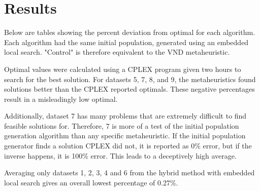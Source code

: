 \documentclass[11pt, letterpaper, onecolumn]{article}
\begin{document}
\section{Results}

Below are tables showing the percent deviation from optimal for each algorithm. Each algorithm had the same initial population, generated using an embedded local search. "Control" is therefore equivalent to the VND metaheuristic. 

Optimal values were calculated using a CPLEX program given two hours to search for the best solution. For datasets 5, 7, 8, and 9, the metaheuristics found solutions better than the CPLEX reported optimals. These negative percentages result in a misleadingly low optimal. 

Additionally, dataset 7 has many problems that are extremely difficult to find feasible solutions for. Therefore, 7 is more of a test of the initial population generation algorithm than any specific metaheuristic. If the initial population generator finds a solution CPLEX did not, it is reported as 0\% error, but if the inverse happens, it is 100\% error. This leads to a deceptively high average. 

Averaging only datasets 1, 2, 3, 4 and 6 from the hybrid method with embedded local search gives an overall lowest percentage of 0.27\%. 

\begin{table}[htbp]
\end{table}

\begin{table}[htbp]
\end{table}


\begin{table}[htbp] 
\end{table}
\end{document}
